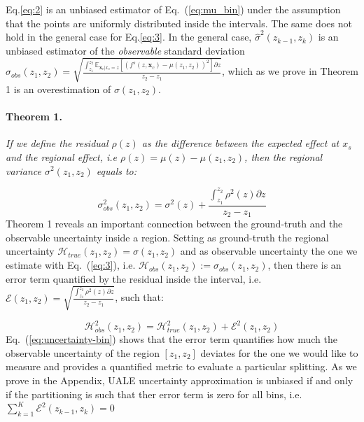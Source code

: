 \documentclass[twoside]{article}
\newcommand{\xc}{\mathbf{x}_c}
\begin{document}
Eq.\eqref{eq:2} is an unbiased estimator of Eq.~(\ref{eq:mu_bin})
under the assumption that the points are uniformly distributed inside
the intervals. The same does not hold in the general case for
Eq.\eqref{eq:3}. In the general case, \(\hat{\sigma}^2(z_{k-1}, z_k)\)
is an unbiased estimator of the \textit{observable} standard deviation
\(\sigma_{obs}(z_1, z_2) = \sqrt{\frac{\int_{z_1}^{z_2}
    \mathbb{E}_{\xc|x_s=z} \left [ (f^s(z, \xc) - \mu(z_1, z_2) )^2
    \right] \partial z}{z_2 - z_1}}\), which as we prove in Theorem 1
is an overestimation of \(\sigma(z_1, z_2)\).

\paragraph{Theorem 1.}
\label{sec:theorem-1}

\textit{If we define the residual \(\rho(z)\) as the difference
  between the expected effect at \(x_s\) and the regional effect, i.e
  \(\rho(z) = \mu(z) - \mu(z_1, z_2)\), then the regional variance
  \(\sigma^2(z_1, z_2)\) equals to:}

\begin{equation}
    \label{eq:bin-uncertainty-proof}
 \sigma_{obs}^2(z_1, z_2) = \sigma^2(z) + \frac{\int_{z_1}^{z_2}\rho^2(z) \partial z}{z_2 - z_1}
\end{equation}
\noindent
Theorem 1 reveals an important connection between the ground-truth and
the observable uncertainty inside a region. Setting as ground-truth
the regional uncertainty
\(\mathcal{H}_{true}(z_1, z_2) = \sigma(z_1, z_2)\) and as observable
uncertainty the one we estimate with Eq.~(\ref{eq:3}), i.e.
\(\mathcal{H}_{obs}(z_1, z_2) := \sigma_{obs}(z_1, z_2)\), then there
is an error term quantified by the residual inside the interval, i.e.
\(\mathcal{E}(z_1, z_2) = \sqrt{\frac{\int_{z_1}^{z_2}\rho^2(z)
    \partial z}{z_2 - z_1}}\), such that:

\begin{equation}
  \label{eq:uncertainty-bin}
  \mathcal{H}^2_{obs}(z_1, z_2) = \mathcal{H}^2_{true}(z_1, z_2) + \mathcal{E}^2(z_1, z_2)
\end{equation}
%
Eq.~(\ref{eq:uncertainty-bin}) shows that the error term quantifies
how much the observable uncertainty of the region \([z_1, z_2]\)
deviates for the one we would like to measure and provides a
quantified metric to evaluate a particular splitting. As we prove in
the Appendix, UALE uncertainty approximation is unbiased if and only if the
partitioning is such that ther error term is zero for all bins, i.e. 
\(\sum_{k=1}^K \mathcal{E}^2(z_{k-1}, z_{k}) = 0\)
\end{document}
